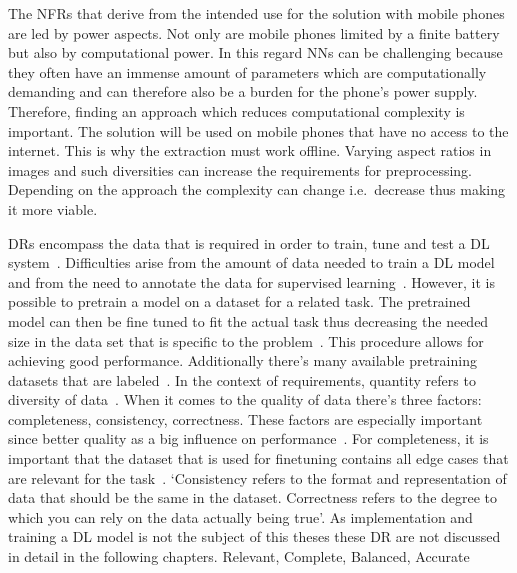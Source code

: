 The \acp{NFR} that derive from the intended use for the solution with mobile phones are led by
power aspects.
Not only are mobile phones limited by a finite battery but also by computational power.
In this regard \acp{NN} can be challenging because they often have an immense amount of parameters
which are computationally demanding and can therefore also be a burden for the phone's power supply.
Therefore, finding an approach which reduces computational complexity is important.
The solution will be used on mobile phones that have no access to the internet.
This is why the extraction must work offline.
Varying aspect ratios in images and such diversities can increase the requirements for preprocessing.
Depending on the approach the complexity can change i.e.\ decrease thus making it more viable.

\acp{DR} encompass the data that is required in order to train, tune and test a \ac{DL}
system~\cite{vogelsang_requirements_2019}.
Difficulties arise from the amount of data needed to train a \ac{DL} model and from the need to
annotate the data for supervised learning~\cite{nowruzi_how_2019}.
However, it is possible to pretrain a model on a dataset for a related task.
The pretrained model can then be fine tuned to fit the actual task thus decreasing the needed size
in the data set that is specific to the problem~\cite{ouyang_factors_2016}.
This procedure allows for achieving good performance.
Additionally there's many available pretraining datasets that are labeled~\cite{ouyang_factors_2016}.
In the context of requirements, quantity refers to diversity of data~\cite{vogelsang_requirements_2019}.
When it comes to the quality of data there's three factors: completeness, consistency,
correctness.
These factors are especially important since better quality as a big influence on
performance~\cite{vogelsang_requirements_2019}.
For completeness, it is important that the dataset that is used for finetuning contains all edge
cases that are relevant for the task~\cite{arpteg_software_2018, vogelsang_requirements_2019}.
`Consistency refers to the format and representation of data that should be the same in the dataset. Correctness refers to the degree to which you can rely on the data actually being
true'\cite{vogelsang_requirements_2019}.
As implementation and training a \ac{DL} model is not the subject of this theses these \ac{DR} are
not discussed in detail in the following chapters.
Relevant, Complete, Balanced, Accurate~\cite{ashmore_assuring_2021}

